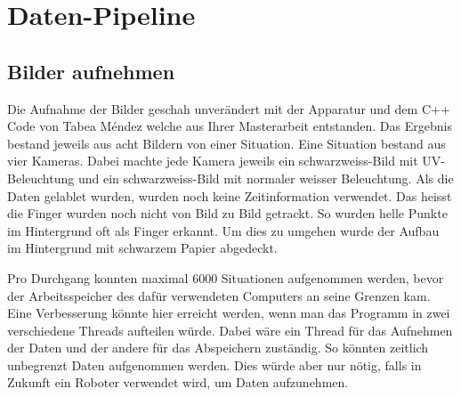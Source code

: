 \newpage
\section{Daten-Pipeline}
\label{chapter:daten_pipeline}
\subsection{Bilder aufnehmen}
\label{chapter:bilder_aufnehmen}
Die Aufnahme der Bilder geschah unverändert mit der Apparatur und dem C++ Code von Tabea Méndez welche aus Ihrer Masterarbeit \cite{TabeasFingertracking} entstanden. 
Das Ergebnis bestand jeweils aus acht Bildern von einer Situation. 
Eine Situation bestand aus vier Kameras.
Dabei machte jede Kamera jeweils ein schwarzweiss-Bild mit UV-Beleuchtung und ein schwarzweiss-Bild mit normaler weisser Beleuchtung.
Als die Daten gelablet wurden, wurden noch keine Zeitinformation verwendet.
Das heisst die Finger wurden noch nicht von Bild zu Bild getrackt.
So wurden helle Punkte im Hintergrund oft als Finger erkannt.
Um dies zu umgehen wurde der Aufbau im Hintergrund mit schwarzem Papier abgedeckt.

Pro Durchgang konnten maximal 6000 Situationen aufgenommen werden, bevor der Arbeitsspeicher des dafür verwendeten Computers an seine Grenzen kam. 
Eine Verbesserung könnte hier erreicht werden, wenn man das Programm in zwei verschiedene Threads aufteilen würde.
Dabei wäre ein Thread für das Aufnehmen der Daten und der andere für das Abspeichern zuständig.
So könnten \grqq{}zeitlich unbegrenzt\grqq{} Daten aufgenommen werden. 
Dies würde aber nur nötig, falls in Zukunft ein Roboter verwendet wird, um Daten aufzunehmen.

